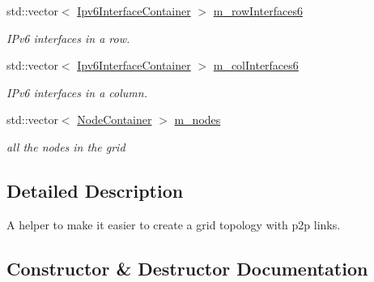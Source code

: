 \begin{DoxyCompactItemize}
std\+::vector$<$ \hyperlink{classns3_1_1Ipv6InterfaceContainer}{Ipv6\+Interface\+Container} $>$ \hyperlink{classns3_1_1PointToPointGridHelper_a8241af071d3601364b9fa76eb0b136fc}{m\+\_\+row\+Interfaces6}
\begin{DoxyCompactList}\small\item\em I\+Pv6 interfaces in a row. \end{DoxyCompactList}\item 
std\+::vector$<$ \hyperlink{classns3_1_1Ipv6InterfaceContainer}{Ipv6\+Interface\+Container} $>$ \hyperlink{classns3_1_1PointToPointGridHelper_a10024c662eaa7a615ddf4d15f4e3a010}{m\+\_\+col\+Interfaces6}
\begin{DoxyCompactList}\small\item\em I\+Pv6 interfaces in a column. \end{DoxyCompactList}\item 
std\+::vector$<$ \hyperlink{classns3_1_1NodeContainer}{Node\+Container} $>$ \hyperlink{classns3_1_1PointToPointGridHelper_a6b36a3c5b58497f3899b089807b25266}{m\+\_\+nodes}
\begin{DoxyCompactList}\small\item\em all the nodes in the grid \end{DoxyCompactList}\end{DoxyCompactItemize}


\subsection{Detailed Description}
A helper to make it easier to create a grid topology with p2p links. 

\subsection{Constructor \& Destructor Documentation}

